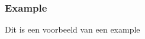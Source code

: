 \documentclass{memoir}
\begin{document}
\begin{simpages}
\subsubsection{Example}
Dit is een voorbeeld van een example
\end{simpages}

\printbibliography
\end{document}
